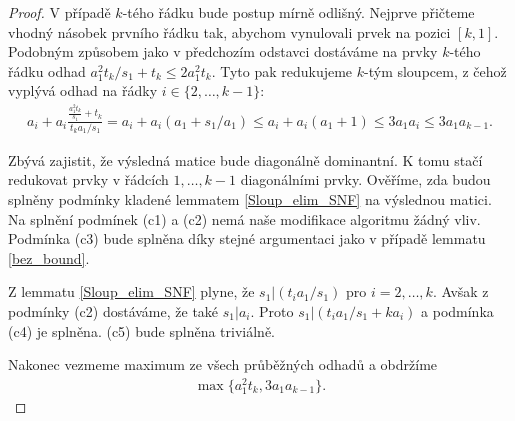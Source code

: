 \begin{proof}
V případě $ k $-tého řádku bude postup mírně odlišný. Nejprve přičteme vhodný 
násobek prvního řádku tak, abychom vynulovali prvek na pozici $ [k, 1] $. 
Podobným způsobem jako v předchozím odstavci dostáváme na prvky $ k $-tého řádku
odhad $ a_1^2 t_k / s_1 + t_k \leq 2 a_1^2 t_k $. Tyto pak redukujeme $ k $-tým 
sloupcem, z čehož vyplývá odhad na řádky $ i \in \{ 2, \dots, k - 1 \} $:
\begin{align*}
    a_i + a_i \frac{\frac{a_1^2 t_k}{s_1} + t_k}{t_k a_1 / s_1} 
        = a_i + a_i (a_1 + s_1 / a_1)
        \leq a_i + a_i (a_1 + 1) 
        \leq 3 a_1 a_i
        \leq 3 a_1 a_{k - 1}.
\end{align*}


Zbývá zajistit, že výsledná matice bude diagonálně dominantní. K tomu stačí 
redukovat prvky v řádcích $ 1, \dots, k - 1 $ diagonálními prvky. Ověříme, zda 
budou splněny podmínky kladené lemmatem \ref{Sloup_elim_SNF} na výslednou matici.
Na splnění podmínek (c1) a (c2) nemá naše modifikace algoritmu žádný vliv.
Podmínka (c3) bude splněna díky stejné argumentaci jako v případě lemmatu
\ref{bez_bound}.

Z lemmatu \ref{Sloup_elim_SNF} plyne, že $ s_1 \vert (t_i a_1/s_1) $ pro
$ i = 2, \dots, k $. Avšak z podmínky (c2) dostáváme, že také $ s_1 \vert a_i $.
Proto $ s_1 \vert (t_i a_1/s_1 + k a_i) $ a podmínka (c4) je splněna. (c5) bude 
splněna triviálně.

Nakonec vezmeme maximum ze všech průběžných odhadů a obdržíme
\begin{align*}
    \max\{ a_1^2 t_k, 3 a_1 a_{k - 1} \}.
\end{align*}
\end{proof}



